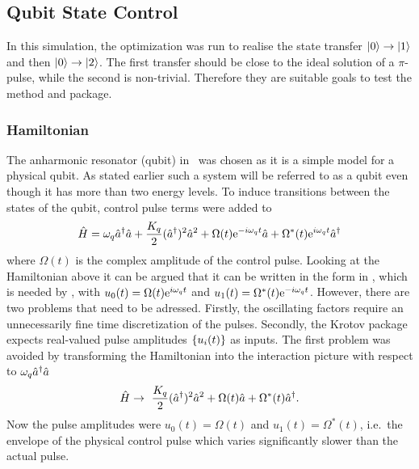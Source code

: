 \documentclass[main.tex]{subfiles}
\begin{document}
\subsection{Qubit State Control}
In this simulation, the optimization was run to realise the state transfer \(\ket{0}\rightarrow\ket{1}\) and then \(\ket{0}\rightarrow\ket{2}\).
The first transfer should be close to the ideal solution of a \(\pi\)-pulse, while the second is non-trivial.
Therefore they are suitable goals to test the method and package.

\subsubsection{Hamiltonian}
The anharmonic resonator (qubit) in~ was chosen as it is a simple model for a physical qubit.
As stated earlier such a system will be referred to as a qubit even though it has more than two energy levels.
To induce transitions between the states of the qubit, control pulse terms were added to~
\begin{equation}
    \hat{H} = \omega_{q} \hat{a}^\dagger\hat{a} + \frac{K_q}{2} (\hat{a}^\dagger)^2\hat{a}^2 + \Omega(t)\mathrm{e}^{-i\omega_{q}t}\hat{a} + \Omega^*(t)\mathrm{e}^{i\omega_{q}t}\hat{a}^\dagger
    \label{eq:system-hamiltonian}
\end{equation}
where \( \Omega(t) \) is the complex amplitude of the control pulse.
Looking at the Hamiltonian above it can be argued that it can be written in the form in , which is needed by \krotov{}, with \( u_0(t) = \Omega(t)\mathrm{e}^{i\omega_{q}t} \) and \( u_1(t) = \Omega^*(t)\mathrm{e}^{-i\omega_{q}t} \).
However, there are two problems that need to be adressed.
Firstly, the oscillating factors require an unnecessarily fine time discretization of the pulses.
Secondly, the Krotov package expects real-valued pulse amplitudes \( \qty{u_i(t)} \) as inputs.
The first problem was avoided by transforming the Hamiltonian into the interaction picture with respect to \(\omega_{q} \hat{a}^\dagger\hat{a} \)
\begin{equation}
    \hat{H} \rightarrow~ \frac{K_q}{2}(\hat{a}^\dagger)^2\hat{a}^2 + \Omega(t)\hat{a} + \Omega^*(t)\hat{a}^\dagger.
    \label{eq:krotov-hamiltonian-rotating}
\end{equation}
Now the pulse amplitudes were \( u_0(t) = \Omega(t) \) and \( u_1(t) = \Omega^*(t) \), i.e.\ the envelope of the physical control pulse which varies significantly slower than the actual pulse.
\end{document}
